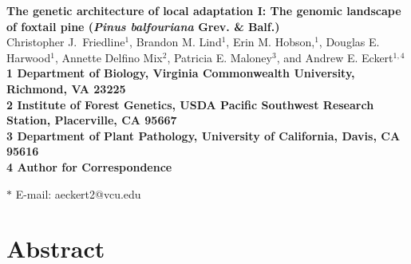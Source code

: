 \documentclass[11pt]{article}
\begin{document}
\begin{flushleft} 
{\Large \textbf{The genetic architecture of local adaptation I: The genomic landscape of 
foxtail pine (\textit{Pinus balfouriana} Grev. \& Balf.)}}
\\
Christopher J.\ Friedline$^{1}$, 
Brandon M. Lind$^{1}$,
Erin M. Hobson,$^{1}$,
Douglas E. Harwood$^{1}$, 
Annette Delfino Mix$^{2}$,
Patricia E. Maloney$^{3}$, and
Andrew E. Eckert$^{1,4}$
\\
\bf{1} Department of Biology, Virginia Commonwealth University, Richmond, VA 23225
\\
\bf{2} Institute of Forest Genetics, USDA Pacific Southwest Research Station, Placerville, 
CA 95667
\\
\bf{3} Department of Plant Pathology, University of California, Davis, CA 95616
\\
\bf{4} Author for Correspondence

$\ast$ E-mail: aeckert2@vcu.edu
\end{flushleft}

\section{Abstract}
\end{document}
